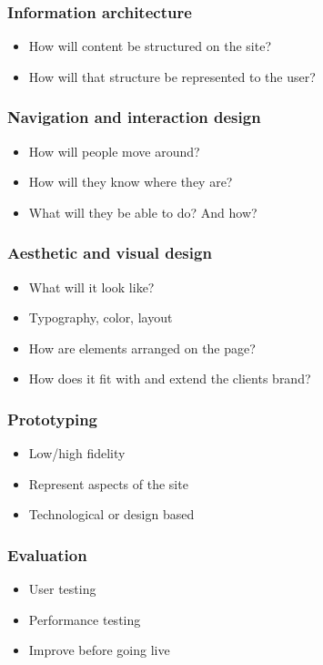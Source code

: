 \subsubsection{Information architecture}
\begin{itemize}
	\item How will content be structured on the site?
	\item How will that structure be represented to the user?
\end{itemize}
\subsubsection{Navigation and interaction design}
\begin{itemize}
	\item How will people move around?
	\item How will they know where they are?
	\item What will they be able to do? And how?
\end{itemize}
\subsubsection{Aesthetic and visual design}
\begin{itemize}
	\item What will it look like?
	\item Typography, color, layout
	\item How are elements arranged on the page?
	\item How does it fit with and extend the clients brand?
\end{itemize}
\subsubsection{Prototyping}
\begin{itemize}
	\item Low/high fidelity
	\item Represent aspects of the site
	\item Technological or design based
\end{itemize}
\subsubsection{Evaluation}
\begin{itemize}
	\item User testing
	\item Performance testing
	\item Improve before going live
\end{itemize}
